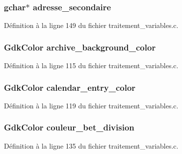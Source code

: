 \subsubsection[{adresse\_\-secondaire}]{\setlength{\rightskip}{0pt plus 5cm}gchar$\ast$ {\bf adresse\_\-secondaire}}\label{affichage_8c_a5495a13fee46daf1634623fe4e63f99a}


Définition à la ligne 149 du fichier traitement\_\-variables.c.

\subsubsection[{archive\_\-background\_\-color}]{\setlength{\rightskip}{0pt plus 5cm}GdkColor {\bf archive\_\-background\_\-color}}\label{affichage_8c_a881db8e6c000ad504ff0183a674cb196}


Définition à la ligne 115 du fichier traitement\_\-variables.c.

\subsubsection[{calendar\_\-entry\_\-color}]{\setlength{\rightskip}{0pt plus 5cm}GdkColor {\bf calendar\_\-entry\_\-color}}\label{affichage_8c_aa809fea280ab9cef6e16774b54a573ae}


Définition à la ligne 119 du fichier traitement\_\-variables.c.

\subsubsection[{couleur\_\-bet\_\-division}]{\setlength{\rightskip}{0pt plus 5cm}GdkColor {\bf couleur\_\-bet\_\-division}}\label{affichage_8c_a9c6b0a0f3037804c43aa435dbb98f7ec}


Définition à la ligne 135 du fichier traitement\_\-variables.c.

